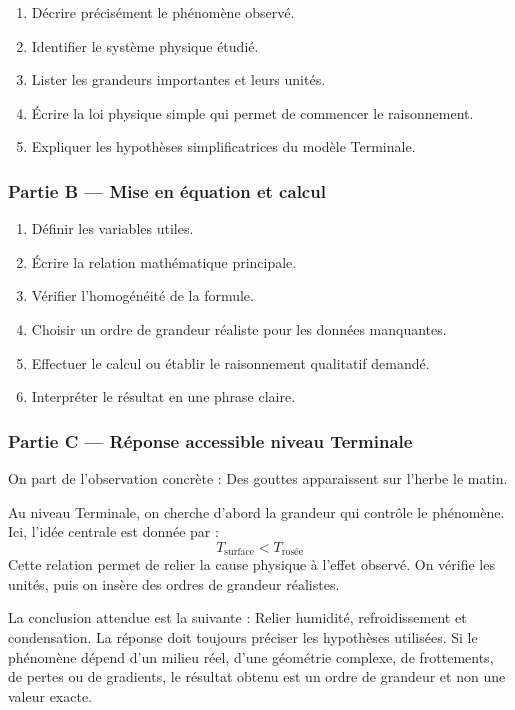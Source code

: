 \documentclass[11pt,a4paper]{article}
\begin{document}
\begin{enumerate}
  \item Décrire précisément le phénomène observé.
  \item Identifier le système physique étudié.
  \item Lister les grandeurs importantes et leurs unités.
  \item Écrire la loi physique simple qui permet de commencer le raisonnement.
  \item Expliquer les hypothèses simplificatrices du modèle Terminale.
\end{enumerate}

\subsubsection*{Partie B — Mise en équation et calcul}

\begin{enumerate}
  \item Définir les variables utiles.
  \item Écrire la relation mathématique principale.
  \item Vérifier l'homogénéité de la formule.
  \item Choisir un ordre de grandeur réaliste pour les données manquantes.
  \item Effectuer le calcul ou établir le raisonnement qualitatif demandé.
  \item Interpréter le résultat en une phrase claire.
\end{enumerate}

\subsubsection*{Partie C — Réponse accessible niveau Terminale}

\begin{corrigebox}
On part de l'observation concrète : Des gouttes apparaissent sur l'herbe le matin.

Au niveau Terminale, on cherche d'abord la grandeur qui contrôle le phénomène. Ici, l'idée centrale est donnée par :
\[
T_{\mathrm{surface}}<T_{\mathrm{rosée}}
\]
Cette relation permet de relier la cause physique à l'effet observé. On vérifie les unités, puis on insère des ordres de grandeur réalistes.

La conclusion attendue est la suivante : Relier humidité, refroidissement et condensation. La réponse doit toujours préciser les hypothèses utilisées. Si le phénomène dépend d'un milieu réel, d'une géométrie complexe, de frottements, de pertes ou de gradients, le résultat obtenu est un ordre de grandeur et non une valeur exacte.
\end{corrigebox}
\end{document}
